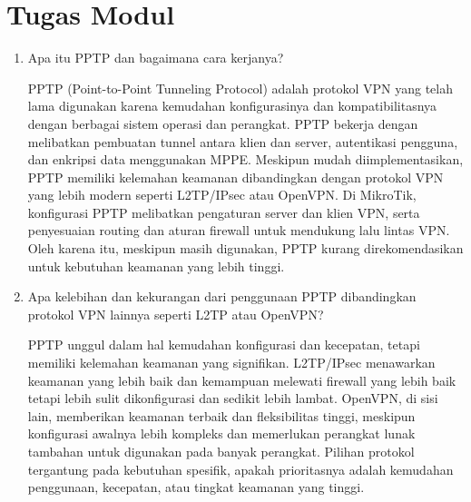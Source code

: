 \section*{Tugas Modul} %
\begin{enumerate}
    \item Apa itu PPTP dan bagaimana cara kerjanya?
    
    PPTP (Point-to-Point Tunneling Protocol) adalah protokol VPN yang telah lama digunakan karena kemudahan konfigurasinya dan kompatibilitasnya dengan berbagai sistem operasi dan perangkat. PPTP bekerja dengan melibatkan pembuatan tunnel antara klien dan server, autentikasi pengguna, dan enkripsi data menggunakan MPPE. Meskipun mudah diimplementasikan, PPTP memiliki kelemahan keamanan dibandingkan dengan protokol VPN yang lebih modern seperti L2TP/IPsec atau OpenVPN. Di MikroTik, konfigurasi PPTP melibatkan pengaturan server dan klien VPN, serta penyesuaian routing dan aturan firewall untuk mendukung lalu lintas VPN. Oleh karena itu, meskipun masih digunakan, PPTP kurang direkomendasikan untuk kebutuhan keamanan yang lebih tinggi.

    \item Apa kelebihan dan kekurangan dari penggunaan PPTP dibandingkan protokol VPN lainnya seperti L2TP atau OpenVPN?
    
    PPTP unggul dalam hal kemudahan konfigurasi dan kecepatan, tetapi memiliki kelemahan keamanan yang signifikan. L2TP/IPsec menawarkan keamanan yang lebih baik dan kemampuan melewati firewall yang lebih baik tetapi lebih sulit dikonfigurasi dan sedikit lebih lambat. OpenVPN, di sisi lain, memberikan keamanan terbaik dan fleksibilitas tinggi, meskipun konfigurasi awalnya lebih kompleks dan memerlukan perangkat lunak tambahan untuk digunakan pada banyak perangkat. Pilihan protokol tergantung pada kebutuhan spesifik, apakah prioritasnya adalah kemudahan penggunaan, kecepatan, atau tingkat keamanan yang tinggi.
\end{enumerate}
